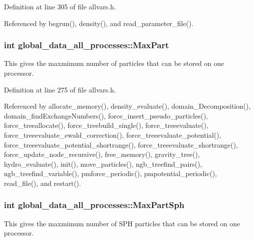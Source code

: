 Definition at line 305 of file allvars.h.



Referenced by begrun(), density(), and read\_\-parameter\_\-file().

\hypertarget{structglobal__data__all__processes_a413b30e91ae833d0c78b42744a99e67f}{
\subsubsection[{MaxPart}]{\setlength{\rightskip}{0pt plus 5cm}int {\bf global\_\-data\_\-all\_\-processes::MaxPart}}}
\label{structglobal__data__all__processes_a413b30e91ae833d0c78b42744a99e67f}
This gives the maxmimum number of particles that can be stored on one processor. 

Definition at line 275 of file allvars.h.



Referenced by allocate\_\-memory(), density\_\-evaluate(), domain\_\-Decomposition(), domain\_\-findExchangeNumbers(), force\_\-insert\_\-pseudo\_\-particles(), force\_\-treeallocate(), force\_\-treebuild\_\-single(), force\_\-treeevaluate(), force\_\-treeevaluate\_\-ewald\_\-correction(), force\_\-treeevaluate\_\-potential(), force\_\-treeevaluate\_\-potential\_\-shortrange(), force\_\-treeevaluate\_\-shortrange(), force\_\-update\_\-node\_\-recursive(), free\_\-memory(), gravity\_\-tree(), hydro\_\-evaluate(), init(), move\_\-particles(), ngb\_\-treefind\_\-pairs(), ngb\_\-treefind\_\-variable(), pmforce\_\-periodic(), pmpotential\_\-periodic(), read\_\-file(), and restart().

\hypertarget{structglobal__data__all__processes_a43dccd3997af759d43a2f3bcce44a2c4}{
\subsubsection[{MaxPartSph}]{\setlength{\rightskip}{0pt plus 5cm}int {\bf global\_\-data\_\-all\_\-processes::MaxPartSph}}}
\label{structglobal__data__all__processes_a43dccd3997af759d43a2f3bcce44a2c4}
This gives the maxmimum number of SPH particles that can be stored on one processor. 

